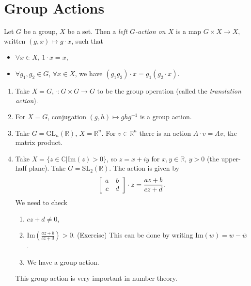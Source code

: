 \documentclass{article}
\begin{document}
\section{Group Actions}

\begin{defn}
Let $G$ be a group, $X$ be a set. Then a 
\emph{left $G$-action on $X$} is a map
$G \times X \to X$, written $(g,x) \mapsto g \cdot x$, such that
\begin{itemize}
  \item{$\forall x \in X$, $1 \cdot x = x$,}
  \item{$\forall g_1, g_2 \in G$, $\forall x \in X$, we have
        $(g_1 g_2) \cdot x = g_1 (g_2 \cdot x)$.
       }
\end{itemize}
\end{defn} 

\begin{xmpl}
\begin{enumerate}
  \item{
        Take $X = G$, $\cdot : G \times G \to G$ to be the group
        operation (called the \emph{translation action}).
       }
  \item{For $X = G$, conjugation $(g, h) \mapsto g h g^{-1}$ is a
        group action.
       }
  \item{Take $G = \mathrm{GL}_n(\mathbb{R})$, $X = \mathbb{R}^n$. For
        $v \in \mathbb{R}^n$ there is an action $A \cdot v = Av$, the
        matrix product.
       }
  \item{Take $X = \{z \in \mathbb{C} | \mathrm{Im}(z) > 0\}$, so
        $z = x + iy$ for $x,y \in \mathbb{R}$, $y > 0$ 
        (the upper-half plane). Take 
        $G = \mathrm{SL}_2(\mathbb{R})$. The action is given by
        $$
        \left[\begin{array}{c c}
          a & b \\ c & d
        \end{array}\right] \cdot z
        = \frac{az + b}{cz + d}.
        $$
        We need to check
        \begin{enumerate}
          \item{$cz + d \neq 0$,
               }
          \item{$\mathrm{Im}\left(\frac{az + b}{cz + d}\right) >
                0$. (Exercise) This can be done by writing
                $\mathrm{Im}(w) = w - \bar{w}$.
               }
          \item{We have a group action.}
        \end{enumerate}
        This group action is very important in number theory.
      }
\end{enumerate}
\end{xmpl}
\end{document}
